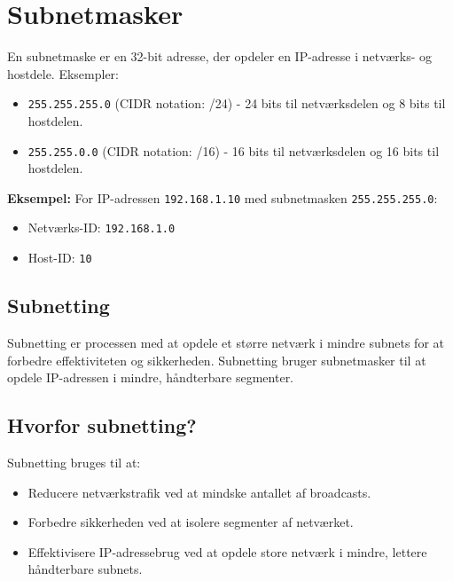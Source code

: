 \section{Subnetmasker}
En subnetmaske er en 32-bit adresse, der opdeler en IP-adresse i netværks- og hostdele. Eksempler:

\begin{itemize}
	\item \texttt{255.255.255.0} (CIDR notation: /24) - 24 bits til netværksdelen og 8 bits til hostdelen.
	\item \texttt{255.255.0.0} (CIDR notation: /16) - 16 bits til netværksdelen og 16 bits til hostdelen.
\end{itemize}

\noindent \textbf{Eksempel:}
\newline\noindent For IP-adressen \texttt{192.168.1.10} med subnetmasken \texttt{255.255.255.0}:
\begin{itemize}
	\item Netværks-ID: \texttt{192.168.1.0}
	\item Host-ID: \texttt{10}
\end{itemize}

\subsection{Subnetting}
Subnetting er processen med at opdele et større netværk i mindre subnets for at forbedre effektiviteten og sikkerheden. Subnetting bruger subnetmasker til at opdele IP-adressen i mindre, håndterbare segmenter.

\subsection{Hvorfor subnetting?}
Subnetting bruges til at:
\begin{itemize}
	\item Reducere netværkstrafik ved at mindske antallet af broadcasts.
	\item Forbedre sikkerheden ved at isolere segmenter af netværket.
	\item Effektivisere IP-adressebrug ved at opdele store netværk i mindre, lettere håndterbare subnets.
\end{itemize}

